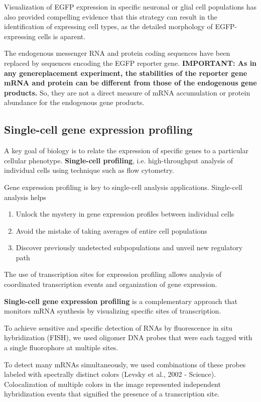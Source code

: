 Visualization of EGFP expression in specific neuronal or glial cell populations
has also provided compelling evidence that this strategy can result in the
identification of expressing cell types, as the detailed morphology of
EGFP-expressing cells is aparent.

The endogenous messenger RNA and protein coding sequences have been replaced by
sequences encoding the EGFP reporter gene. {\bf IMPORTANT: As in any
genereplacement experiment, the stabilities of the reporter gene mRNA and
protein can be different from those of the endogenous gene products.} So, they
are not a direct measure of mRNA accumulation or protein abundance for the
endogenous gene products.


\subsection{Single-cell gene expression profiling}
\label{sec:single-cell-gene-expression-profiling}

A key goal of biology is to relate the expression of specific genes to a
particular cellular phenotype.  {\bf Single-cell profiling}, i.e.
high-throughput analysis of individual cells using technique such as flow
cytometry.

Gene expression profiling is key to single-cell analysis
applications. Single-cell analysis helps
\begin{enumerate}
  \item Unlock the mystery in gene expression profiles between individual cells
  \item Avoid the mistake of taking averages of entire cell populations
  \item Discover previously undetected subpopulations and unveil new regulatory
  path
\end{enumerate}

The  use  of  transcription  sites  for  expression 
profiling  allows analysis of coordinated transcription events and  organization  of  gene expression.

{\bf Single-cell gene expression profiling} is a  complementary approach that
monitors mRNA synthesis  by  visualizing  specific  sites  of transcription.

To achieve  sensitive  and  specific  detection  of RNAs by fluorescence in situ
hybridization (FISH), we used oligomer DNA probes that were each tagged with a
single fluorophore at  multiple  sites.

To  detect  many  mRNAs simultaneously, we used combinations of these probes
labeled with spectrally distinct colors (Levsky et al., 2002 - Science).
Colocalization of multiple colors in the image represented independent 
hybridization  events  that  signified  the  presence  of  a  transcription 
site.


